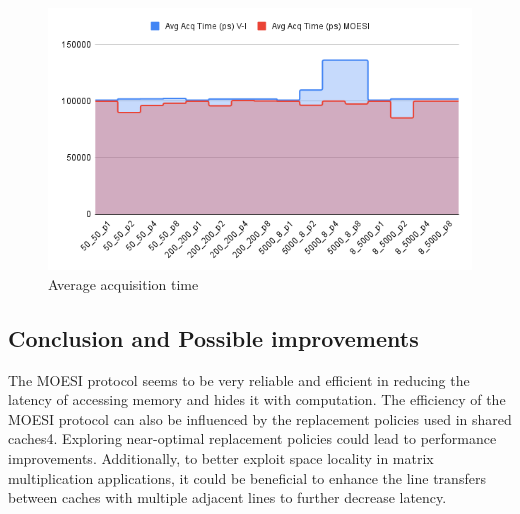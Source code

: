\begin{figure}[H]
    \centering
    \includegraphics[scale=0.4]{Figures/avg_Access_bus.png}
    \caption{Average acquisition time}
    \label{fig:accessbus}
\end{figure}


\subsection{Conclusion and Possible improvements}
The MOESI protocol seems to be very reliable and efficient in reducing the latency of accessing memory and hides it with computation. The efficiency of the MOESI protocol can also be influenced by the replacement policies used in shared caches4. Exploring near-optimal replacement policies could lead to performance improvements. Additionally, to better exploit space locality in matrix multiplication applications, it could be beneficial to enhance the line transfers between caches with multiple adjacent lines to further decrease latency.
